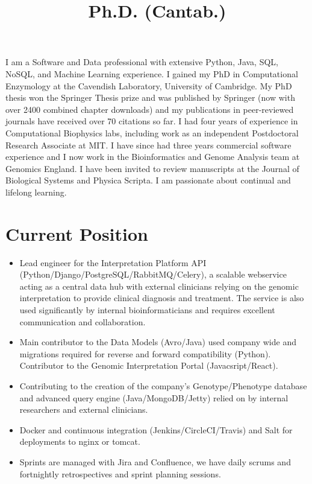 \documentclass[11pt,a4paper,sans]{moderncv}        %
\title{Ph.D. (Cantab.)}                               %
\begin{document}
\makecvtitle
\vspace*{-1.0cm}
%
I am a Software and Data professional with extensive Python, Java, SQL, NoSQL, and Machine Learning experience. 
%
I gained my PhD in Computational Enzymology at the Cavendish Laboratory, University of Cambridge. 
%
My PhD thesis won the Springer Thesis prize and was published by Springer (now with over 2400 combined chapter downloads) and my publications in peer-reviewed journals have received over 70 citations so far. 
%
I had four years of experience in Computational Biophysics labs, including work as an independent Postdoctoral Research Associate at MIT. 
%
I have since had three years commercial software experience and I now work in the Bioinformatics and Genome Analysis team at Genomics England. 
%
I have been invited to review manuscripts at the Journal of Biological Systems and Physica Scripta. 
%
I am passionate about continual and lifelong learning.


\vspace*{-0.4cm}
\section{Current Position}
\vspace*{-0.15cm}
{
\begin{itemize}%
\item Lead engineer for the Interpretation Platform API (Python/Django/PostgreSQL/RabbitMQ/Celery), a scalable webservice acting as a central data hub 
with external clinicians relying on the genomic interpretation to provide clinical diagnosis and treatment. The service is also used significantly by internal bioinformaticians and requires excellent communication and collaboration.
\item Main contributor to the Data Models (Avro/Java) used company wide and migrations required for reverse and forward compatibility (Python). Contributor to the Genomic Interpretation Portal (Javacsript/React).
\item Contributing to the creation of the company's Genotype/Phenotype database and advanced query engine (Java/MongoDB/Jetty) relied on by internal researchers and external clinicians.
\item Docker and continuous integration (Jenkins/CircleCI/Travis) and Salt for deployments  to nginx or tomcat.
\item Sprints are managed with Jira and Confluence, we have daily scrums and fortnightly retrospectives and sprint planning sessions.
\end{itemize}}
\vspace*{-0.4cm}
\end{document}
